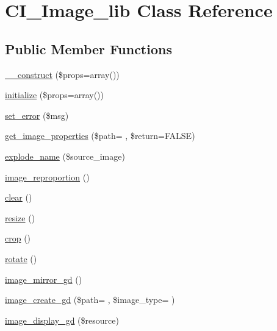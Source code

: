 \hypertarget{class_c_i___image__lib}{}\section{C\+I\+\_\+\+Image\+\_\+lib Class Reference}
\label{class_c_i___image__lib}
\subsection*{Public Member Functions}
\begin{DoxyCompactItemize}
\item 
\hyperlink{class_c_i___image__lib_a563262d396a1cef6153c9998d77bb548}{\+\_\+\+\_\+construct} (\$props=array())
\item 
\hyperlink{class_c_i___image__lib_a0bccf32e3d2d283de0521949330cb969}{initialize} (\$props=array())
\item 
\hyperlink{class_c_i___image__lib_a892f1ba7cba3731a3fc68f1f64e92610}{set\+\_\+error} (\$msg)
\item 
\hyperlink{class_c_i___image__lib_a77ab93f41bdc26b9220b69a91644d854}{get\+\_\+image\+\_\+properties} (\$path= \textquotesingle{}\textquotesingle{}, \$return=F\+A\+L\+SE)
\item 
\hyperlink{class_c_i___image__lib_a32661288e0bea18ea50fbb7be6535af5}{explode\+\_\+name} (\$source\+\_\+image)
\item 
\hyperlink{class_c_i___image__lib_a55ee590fb313c50e99d6c1d4cd9618d2}{image\+\_\+reproportion} ()
\item 
\hyperlink{class_c_i___image__lib_aa821bec12eaa7e0f649397c9675ff505}{clear} ()
\item 
\hyperlink{class_c_i___image__lib_a94e38a7d478ce07200a52c51497e598e}{resize} ()
\item 
\hyperlink{class_c_i___image__lib_a77248c0134d1b117eb36774ecee6e04c}{crop} ()
\item 
\hyperlink{class_c_i___image__lib_a74e94d71195d9cbb9c9e3bca3353d912}{rotate} ()
\item 
\hyperlink{class_c_i___image__lib_a3f6d47ec077726da699890d4644797ad}{image\+\_\+mirror\+\_\+gd} ()
\item 
\hyperlink{class_c_i___image__lib_a9de08e24f6573c9d80ccf38f95c33d1f}{image\+\_\+create\+\_\+gd} (\$path= \textquotesingle{}\textquotesingle{}, \$image\+\_\+type= \textquotesingle{}\textquotesingle{})
\item 
\hyperlink{class_c_i___image__lib_af641d1806701b178dfba3dbf7da54462}{image\+\_\+display\+\_\+gd} (\$resource)

\end{DoxyCompactItemize}
